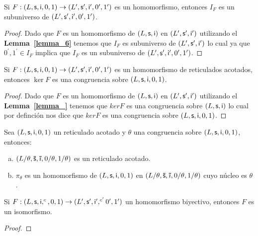  \begin{lemma} \label{lemma_13}
    \PN Si $F: \ACOTADO \rightarrow \ACOTADOPRIMO$ es un homomorfismo, entonces $I_{F}$ es un subuniverso de $\ACOTADOPRIMO$.
  \end{lemma}
  \begin{proof}
    \PN Dado que $F$ es un homomorfismo de $\RET$ en $ \RETPRIMO$ utilizando el
    \textbf{Lemma~\ref{lemma_6}} tenemos que $I_{F}$ es subuniverso de $\RETPRIMO$ lo
    cual ya que $0^{\prime}, 1^{\prime} \in I_{F}$ implica que $I_{F}$ es un subuniverso de $(L^{\prime}, \SU^{\prime},
    \IN^{\prime}, 0^{\prime}, 1^{\prime})$.
  \end{proof}

  \begin{lemma} \label{lemma_14}
    \PN Si $F: \ACOTADO \rightarrow \ACOTADOPRIMO$ es un homomorfismo de reticulados acotados, entonces $\ker F$ es una
    congruencia sobre $\ACOTADO$.
  \end{lemma}
  \begin{proof}
    \PN Dado que $F$ es un homomorfismo de $\RET$ en $ \RETPRIMO$ utilizando el
    \textbf{Lemma~\ref{lemma_}} tenemos que $ker F$ es una congruencia sobre $\RET$ lo cual por definción nos
    dice que $ker F$ es una congruencia sobre $\ACOTADO$.
  \end{proof}

  \begin{lemma} \label{lemma_15}
    \PN Sea $\ACOTADO$ un reticulado acotado y $\theta$ una congruencia sobre $\ACOTADO$, entonces:
    \begin{enumerate}[a)]
      \item $\ACOTADOCOCIENTADO$ es un reticulado acotado.
      \item $\pi_{\theta}$ es un homomorfismo de $\ACOTADO$ en $\ACOTADOCOCIENTADO$ cuyo núcleo es $\theta$.
    \end{enumerate}
  \end{lemma}

  \begin{lemma} \label{lemma_16}
    \PN Si $F:\COMPLEMENTADO \rightarrow \COMPLEMENTADOPRIMO$ un homomorfismo biyectivo, entonces $F$ es un isomorfismo.
  \end{lemma}
  \begin{proof}
  \end{proof}

